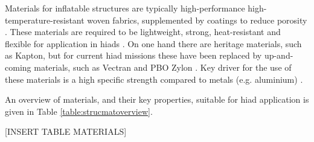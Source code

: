 Materials for inflatable structures are typically high-performance high-temperature-resistant woven fabrics, supplemented by coatings to reduce porosity \cite{Jenkins2001}. These materials are required to be lightweight, strong, heat-resistant and flexible for application in \glspl{hiad} \cite{Samareh2010}. On one hand there are heritage materials, such as Kapton, but for current \gls{hiad} missions these have been replaced by up-and-coming materials, such as Vectran and PBO Zylon \cite{Dillman2012,  Smith2010}. Key driver for the use of these materials is a high specific strength compared to metals (e.g. aluminium) \cite{Samareh2010}. 

An overview of materials, and their key properties, suitable for \gls{hiad} application is given in Table \ref{table:strucmatoverview}. 

[INSERT TABLE MATERIALS]

